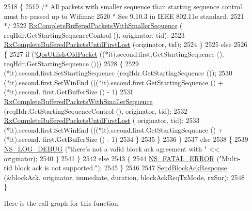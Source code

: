\begin{DoxyCode}
2518             \{
2519               \textcolor{comment}{/* All packets with smaller sequence than starting sequence control must be passed up to
       Wifimac}
2520 \textcolor{comment}{               * See 9.10.3 in IEEE 802.11e standard.}
2521 \textcolor{comment}{               */}
2522               \hyperlink{classns3_1_1MacLow_aaed81a6cbf94baf2b2f17b9f96b8474d}{RxCompleteBufferedPacketsWithSmallerSequence} (
      reqHdr.GetStartingSequenceControl (), originator, tid);
2523               \hyperlink{classns3_1_1MacLow_aeadf392d37d323fb81f0ef0766f2359a}{RxCompleteBufferedPacketsUntilFirstLost} (originator, 
      tid);
2524             \}
2525           \textcolor{keywordflow}{else}
2526             \{
2527               \textcolor{keywordflow}{if} (!\hyperlink{group__wifi_ga5cb9ea723837c5a036e622612f2d0bb0}{QosUtilsIsOldPacket} ((*it).second.first.GetStartingSequence (), 
      reqHdr.GetStartingSequence ()))
2528                 \{
2529                   (*it).second.first.SetStartingSequence (reqHdr.GetStartingSequence ());
2530                   (*it).second.first.SetWinEnd (((*it).second.first.GetStartingSequence () + (*it).second.
      first.GetBufferSize () - 1) %
2531                   \hyperlink{classns3_1_1MacLow_aaed81a6cbf94baf2b2f17b9f96b8474d}{RxCompleteBufferedPacketsWithSmallerSequence} 
      (reqHdr.GetStartingSequenceControl (), originator, tid);
2532                   \hyperlink{classns3_1_1MacLow_aeadf392d37d323fb81f0ef0766f2359a}{RxCompleteBufferedPacketsUntilFirstLost} (
      originator, tid);
2533                   (*it).second.first.SetWinEnd (((*it).second.first.GetStartingSequence () + (*it).second.
      first.GetBufferSize () - 1) %
2534                 \}
2535             \}
2536         \}
2537       \textcolor{keywordflow}{else}
2538         \{
2539           \hyperlink{group__logging_ga413f1886406d49f59a6a0a89b77b4d0a}{NS\_LOG\_DEBUG} (\textcolor{stringliteral}{"there's not a valid block ack agreement with "} << originator);
2540         \}
2541     \}
2542   \textcolor{keywordflow}{else}
2543     \{
2544       \hyperlink{group__fatal_ga5131d5e3f75d7d4cbfd706ac456fdc85}{NS\_FATAL\_ERROR} (\textcolor{stringliteral}{"Multi-tid block ack is not supported."});
2545     \}
2546 
2547   \hyperlink{classns3_1_1MacLow_a85c374be43ba3bd52fd1ad6efdfef6c6}{SendBlockAckResponse} (&blockAck, originator, immediate, duration, blockAckReqTxMode, 
      rxSnr);
2548 \}
\end{DoxyCode}


Here is the call graph for this function\+:




